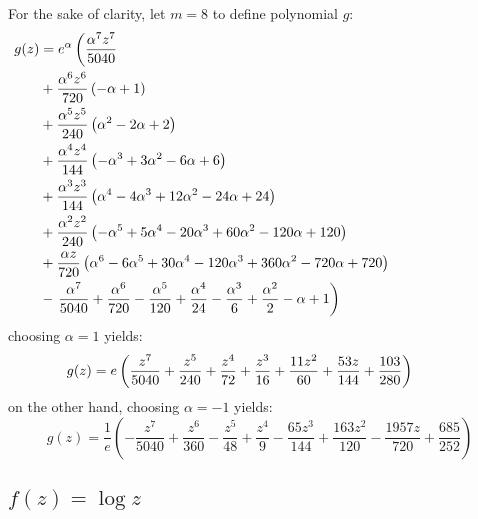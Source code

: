 For the sake of clarity, let $m=8$ to define polynomial $g$:
\begin{displaymath}
\hspace{-3cm}
\begin{split}
g{\left (z \right )} &= e^{\alpha}\left(\frac{\alpha^{7} z^{7}}{5040}\right. \\
&+ \frac{\alpha^{6} z^{6}}{720} \left(- \alpha + 1\right) \\
&+ \frac{\alpha^{5} z^{5}}{240} \left(\alpha^{2} - 2 \alpha + 2\right) \\
&+ \frac{\alpha^{4} z^{4}}{144} \left(- \alpha^{3} + 3 \alpha^{2} - 6 \alpha + 6\right) \\
&+ \frac{\alpha^{3} z^{3}}{144} \left(\alpha^{4} - 4 \alpha^{3} + 12 \alpha^{2} - 24 \alpha + 24\right) \\
&+ \frac{\alpha^{2} z^{2}}{240} \left(- \alpha^{5} + 5 \alpha^{4} - 20 \alpha^{3} + 60 \alpha^{2} - 120 \alpha + 120\right) \\
&+ \frac{\alpha z}{720} \left(\alpha^{6} - 6 \alpha^{5} + 30 \alpha^{4} - 120 \alpha^{3} + 360 \alpha^{2} - 720 \alpha + 720\right) \\
&- \left.\frac{\alpha^{7}}{5040} + \frac{\alpha^{6}}{720} - \frac{\alpha^{5}}{120} + \frac{\alpha^{4}}{24} - \frac{\alpha^{3}}{6} + \frac{\alpha^{2}}{2} -\alpha + 1\right) 
\end{split}
\end{displaymath}
choosing $\alpha=1$ yields:
\begin{displaymath}
\hspace{-1cm}
g{\left (z \right )} = e \left(\frac{z^{7}}{5040} + \frac{z^{5}}{240} + \frac{z^{4}}{72} + \frac{z^{3}}{16} + \frac{11 z^{2}}{60} + \frac{53 z}{144} + \frac{103}{280}\right)
\end{displaymath}
on the other hand, choosing $\alpha=-1$ yields:
\begin{displaymath}
g{\left (z \right )} = \frac{1}{e} \left( - \frac{z^{7}}{5040} + \frac{z^{6}}{360} - \frac{z^{5}}{48} + \frac{z^{4}}{9}\right. - \left.\frac{65 z^{3}}{144} + \frac{163 z^{2}}{120} - \frac{1957 z}{720} + \frac{685}{252}\right)
\end{displaymath}


\subsection{$f(z)=\log{z}$}

